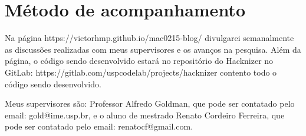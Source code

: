 \documentclass[10pt,twoside,a4paper]{article}
\begin{document}
\section{Método de acompanhamento}

    Na página https://victorhmp.github.io/mac0215-blog/ divulgarei semanalmente as discussões realizadas com meus supervisores e os avanços na pesquisa. Além da página, o código sendo desenvolvido estará no repositório do Hacknizer no GitLab: https://gitlab.com/uspcodelab/projects/hacknizer contento todo o código sendo desenvolvido.
    
    Meus supervisores são: Professor Alfredo Goldman, que pode ser contatado pelo email: gold@ime.usp.br, e o aluno de mestrado Renato Cordeiro Ferreira, que pode ser contatado pelo email: renatocf@gmail.com.
    



\end{document}
